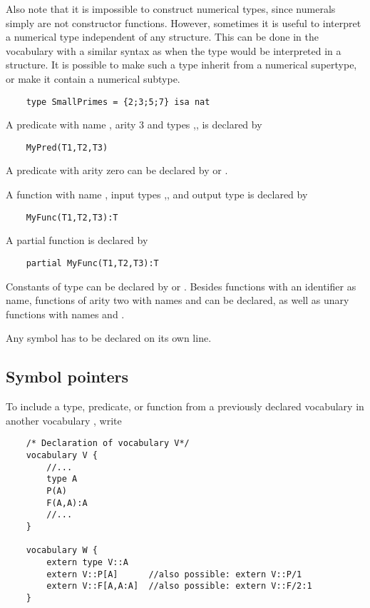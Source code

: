 Also note that it is impossible to construct numerical types, since numerals simply are not constructor functions. However, sometimes it is useful to interpret a numerical type independent of any structure. This can be done in the vocabulary with a similar syntax as when the type would be interpreted in a structure. It is possible to make such a type inherit from a numerical supertype, or make it contain a numerical subtype.
\begin{lstlisting}
	type SmallPrimes = {2;3;5;7} isa nat 
\end{lstlisting}

A predicate with name , arity 3 and types ,, is declared by
\begin{lstlisting}
	MyPred(T1,T2,T3) 
\end{lstlisting}

A predicate with arity zero can be declared by  or .

A function with name , input types ,, and output type   is declared by
\begin{lstlisting}
	MyFunc(T1,T2,T3):T
\end{lstlisting}

A partial function is declared by 
\begin{lstlisting}
	partial MyFunc(T1,T2,T3):T
\end{lstlisting}

Constants of type  can be declared by  or .  Besides functions with an identifier as name, functions of arity two with names \code{+,-,*,/,\%}  and \code{\textasciicircum} can be declared, as well as unary functions with names \code{-} and .

Any symbol has to be declared on its own line.



\subsection{Symbol pointers}

To include a type, predicate, or function from a previously declared vocabulary  in another vocabulary , write
\begin{lstlisting}
	/* Declaration of vocabulary V*/
	vocabulary V {
		//...
		type A
		P(A)
		F(A,A):A
		//...
	}

	vocabulary W {
		extern type V::A
		extern V::P[A]		//also possible: extern V::P/1
		extern V::F[A,A:A]	//also possible: extern V::F/2:1
	}
\end{lstlisting}

